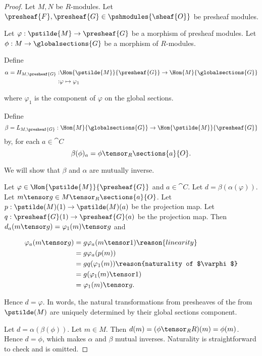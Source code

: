 
\begin{proof}
Let $M,N$ be $R$-modules. 
Let $\presheaf{F},\presheaf{G} \in \pshmodules{\sheaf{O}}$ be presheaf modules.

Let $\varphi:\pstilde{M} \rightarrow \presheaf{G}$ be a morphism of presheaf modules.
Let $\phi: M \rightarrow \globalsections{G}$ be a morphism of $R$-modules.

Define
\begin{align*}
\alpha = H_{M,\presheaf{G}} :& 
	\Hom{\pstilde{M}}{\presheaf{G}} \rightarrow \Hom{M}{\globalsections{G}} \\
	:& \varphi \mapsto \varphi_1
\end{align*}

where $\varphi_1$ is the component of $\varphi$ on the global sections.

Define 
\[\beta = L_{M,\presheaf{G}}: 
	\Hom{M}{\globalsections{G}} \rightarrow \Hom{\pstilde{M}}{\presheaf{G}}
\] 
by, for each $a\in \cat{C}$
\[ \beta(\phi)_a = \phi \tensor_R \sections{a}{O}.\]

We will show that $\beta$ and $\alpha$ are mutually inverse. 

Let $\varphi \in \Hom{\pstilde{M}}{\presheaf{G}}$
and $a\in \cat{C}$.
Let $d = \beta(\alpha(\varphi))$. 
Let $m \tensor g \in M \tensor_R \sections{a}{O}$.
Let $p: \pstilde(M)(1)\rightarrow \pstilde(M)(a)$ be the projection map.
Let $q: \presheaf{G}(1)\rightarrow \presheaf{G}(a)$ be the projection map.
Then $d_a(m \tensor g) = \varphi_1(m) \tensor g$
and

\begin{align*}
	\varphi_a(m \tensor g) &=  g \varphi_a(m \tensor 1) \reason{linearity}\\
		&= g \varphi_a(p(m)) \\
		&= g q(\varphi_1(m)) \reason{naturality of $\varphi$}\\
		&= g (\varphi_1(m) \tensor 1) \\
		&= \varphi_1(m) \tensor g.
\end{align*}

Hence $d = \varphi$. 
In words, the natural transformations from presheaves of the from $\pstilde(M)$ 
are uniquely determined by their global sections component.

Let $d = \alpha(\beta(\phi))$. 
Let $m \in M$.
Then $d(m) = (\phi \tensor_R R)(m) = \phi(m)$.
Hence $d = \phi$, which makes $\alpha$ and $\beta$ mutual inverses.
Naturality is straightforward to check and is omitted.
\end{proof}
